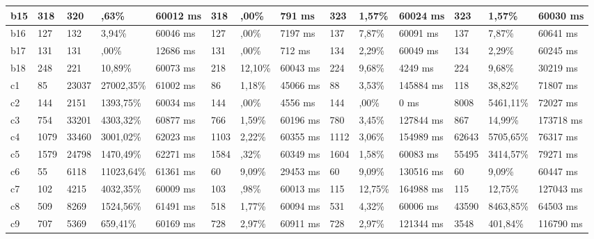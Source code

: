\begin{table}[]
\begin{adjustbox}{angle=90}
{\begin{tabular}{|c|c|l|l|l|l|l|l|l|l|l|l|l|l|}
\multicolumn{1}{|l|}{b15} & \multicolumn{1}{l|}{318} &320 & ,63\% & 60012 ms  & 318 & ,00\% & 791 ms  & 323 & 1,57\% & 60024 ms  & 323 & 1,57\% & 60030 ms \\ \hline
\multicolumn{1}{|l|}{b16} & \multicolumn{1}{l|}{127} &132 & 3,94\% & 60046 ms  & 127 & ,00\% & 7197 ms  & 137 & 7,87\% & 60091 ms  & 137 & 7,87\% & 60641 ms \\ \hline
\multicolumn{1}{|l|}{b17} & \multicolumn{1}{l|}{131} &131 & ,00\% & 12686 ms  & 131 & ,00\% & 712 ms  & 134 & 2,29\% & 60049 ms  & 134 & 2,29\% & 60245 ms \\ \hline
\multicolumn{1}{|l|}{b18} & \multicolumn{1}{l|}{248} &221 & 10,89\% & 60073 ms  & 218 & 12,10\% & 60043 ms  & 224 & 9,68\% & 4249 ms  & 224 & 9,68\% & 30219 ms \\ \hline
\multicolumn{1}{|l|}{c1} & \multicolumn{1}{l|}{85} &23037 & 27002,35\% & 61002 ms  & 86 & 1,18\% & 45066 ms  & 88 & 3,53\% & 145884 ms  & 118 & 38,82\% & 71807 ms \\ \hline
\multicolumn{1}{|l|}{c2} & \multicolumn{1}{l|}{144} &2151 & 1393,75\% & 60034 ms  & 144 & ,00\% & 4556 ms  & 144 & ,00\% & 0 ms  & 8008 & 5461,11\% & 72027 ms \\ \hline
\multicolumn{1}{|l|}{c3} & \multicolumn{1}{l|}{754} &33201 & 4303,32\% & 60877 ms  & 766 & 1,59\% & 60196 ms  & 780 & 3,45\% & 127844 ms  & 867 & 14,99\% & 173718 ms \\ \hline
\multicolumn{1}{|l|}{c4} & \multicolumn{1}{l|}{1079} &33460 & 3001,02\% & 62023 ms  & 1103 & 2,22\% & 60355 ms  & 1112 & 3,06\% & 154989 ms  & 62643 & 5705,65\% & 76317 ms \\ \hline
\multicolumn{1}{|l|}{c5} & \multicolumn{1}{l|}{1579} &24798 & 1470,49\% & 62271 ms  & 1584 & ,32\% & 60349 ms  & 1604 & 1,58\% & 60083 ms  & 55495 & 3414,57\% & 79271 ms \\ \hline
\multicolumn{1}{|l|}{c6} & \multicolumn{1}{l|}{55} &6118 & 11023,64\% & 61361 ms  & 60 & 9,09\% & 29453 ms  & 60 & 9,09\% & 130516 ms  & 60 & 9,09\% & 60447 ms \\ \hline
\multicolumn{1}{|l|}{c7} & \multicolumn{1}{l|}{102} &4215 & 4032,35\% & 60009 ms  & 103 & ,98\% & 60013 ms  & 115 & 12,75\% & 164988 ms  & 115 & 12,75\% & 127043 ms \\ \hline
\multicolumn{1}{|l|}{c8} & \multicolumn{1}{l|}{509} &8269 & 1524,56\% & 61491 ms  & 518 & 1,77\% & 60094 ms  & 531 & 4,32\% & 60006 ms  & 43590 & 8463,85\% & 64503 ms \\ \hline
\multicolumn{1}{|l|}{c9} & \multicolumn{1}{l|}{707} &5369 & 659,41\% & 60169 ms  & 728 & 2,97\% & 60911 ms  & 728 & 2,97\% & 121344 ms  & 3548 & 401,84\% & 116790 ms \\ \hline

\end{tabular}}
\end{adjustbox}
\end{table}
